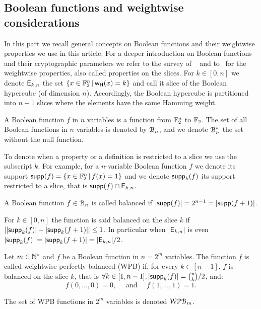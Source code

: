 \documentclass[11pt]{llncs}
\begin{document}
\subsection{Boolean functions and weightwise considerations}

In this part we recall general concepts on Boolean functions and their weightwise properties we use in this article. 
For a deeper introduction on Boolean functions and their cryptographic parameters we refer to the survey of \eg~\cite{Carlet20} and to~\cite{TOSC:CarMeaRot17} for the weightwise properties, also called properties on the slices.
For $k \in [0,n]$ we denote $\mathsf{E}_{k,n}$ the set $\{x\in \mathbb{F}_2^n \, | \, \mathsf{w_H}(x)=k  \}$ and call it slice of the Boolean hypercube (of dimension $n$). 
Accordingly, the Boolean hypercube is partitioned into $n+1$ slices where the elements have the same Hamming weight.

\begin{definition}\label{def:bool_f}
	A Boolean function $f$ in $n$ variables is a function from $\mathbb{F}_2^n$ to $\mathbb{F}_2$. 
	The set of all Boolean functions in $n$ variables is denoted by $\mathcal{B}_n$, and we denote $\mathcal{B}_n^*$ the set without the null function.
\end{definition}


To denote when a property or a definition is restricted to a slice we use the subscript $k$. 
For example, for a $n$-variable Boolean function $f$ we denote its support $\mathsf{supp}(f)=\{x\in \mathbb{F}_2^n \, | \, f(x)=1  \}$ and we denote $\mathsf{supp}_{k}(f)$ its support restricted to a slice, that is $\mathsf{supp}(f)\cap \mathsf{E}_{k,n}$.


\begin{definition}[Balancedness]\label{def:balancedness}
	A Boolean function $f\in \mathcal{B}_n$ is called balanced if $|\mathsf{supp}(f)|=2^{n-1}=|\mathsf{supp}(f+1)|$. 
	
	For $k\in [0,n]$ the function is said balanced on the slice $k$ if $||\mathsf{supp}_{k}(f)|-|\mathsf{supp}_{k}(f+1)| |\le 1$. In particular when $|\mathsf{E}_{k,n}|$ is even $|\mathsf{supp}_{k}(f)|=|\mathsf{supp}_{k}(f+1)|=|\mathsf{E}_{k,n}|/2$.
\end{definition}

\begin{definition}\label{def:WPB}
	Let $m\in \mathbb{N}^*$ and $f$ be a Boolean function in $n=2^m$ variables. 
	The function $f$ is called weightwise perfectly balanced (WPB) if, for every $k\in[n-1]$, $f$ is balanced on the slice $k$, that is $\forall k \in [1,n-1], |\mathsf{supp}_{k}(f)|=\binom{n}{k}/2$, and:
	\[f(0,\dots,0)=0,\quad \text{ and } \quad f(1,\dots,1)=1.\]
	
	The set of WPB functions in $2^m$ variables is denoted $\mathcal{WPB}_{m}$.
	
	
\end{definition}
\end{document}
